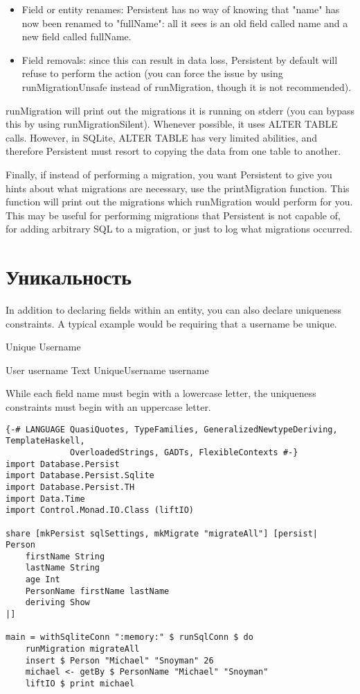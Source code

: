 \begin{itemize}
	\item Field or entity renames: Persistent has no way of knowing that "name" has now been renamed to "fullName": all it sees is an old field called name and a new field called fullName.
	\item Field removals: since this can result in data loss, Persistent by default will refuse to perform the action (you can force the issue by using runMigrationUnsafe instead of runMigration, though it is not recommended).
\end{itemize}

runMigration will print out the migrations it is running on stderr (you can bypass this by using runMigrationSilent). Whenever possible, it uses ALTER TABLE calls. However, in SQLite, ALTER TABLE has very limited abilities, and therefore Persistent must resort to copying the data from one table to another.

Finally, if instead of performing a migration, you want Persistent to give you hints about what migrations are necessary, use the printMigration function. This function will print out the migrations which runMigration would perform for you. This may be useful for performing migrations that Persistent is not capable of, for adding arbitrary SQL to a migration, or just to log what migrations occurred.

\section{Уникальность} %

In addition to declaring fields within an entity, you can also declare uniqueness constraints. A typical example would be requiring that a username be unique.


Unique Username

User
    username Text
    UniqueUsername username

While each field name must begin with a lowercase letter, the uniqueness constraints must begin with an uppercase letter.

\begin{lstlisting}
{-# LANGUAGE QuasiQuotes, TypeFamilies, GeneralizedNewtypeDeriving, TemplateHaskell,
             OverloadedStrings, GADTs, FlexibleContexts #-}
import Database.Persist
import Database.Persist.Sqlite
import Database.Persist.TH
import Data.Time
import Control.Monad.IO.Class (liftIO)

share [mkPersist sqlSettings, mkMigrate "migrateAll"] [persist|
Person
    firstName String
    lastName String
    age Int
    PersonName firstName lastName
    deriving Show
|]

main = withSqliteConn ":memory:" $ runSqlConn $ do
    runMigration migrateAll
    insert $ Person "Michael" "Snoyman" 26
    michael <- getBy $ PersonName "Michael" "Snoyman"
    liftIO $ print michael
\end{lstlisting}%


